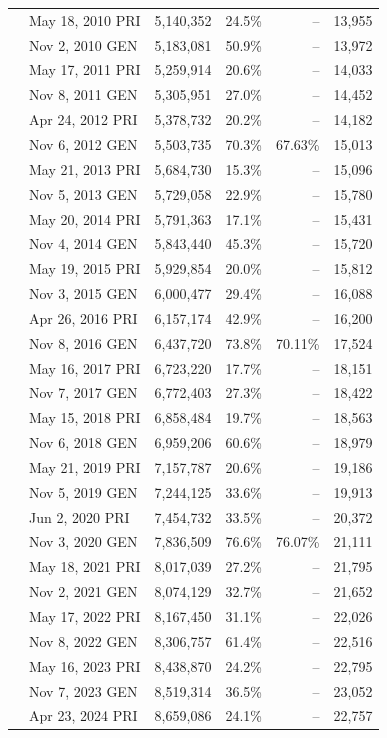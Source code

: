 \begin{longtable}{llrrrr}
 & May 18, 2010 PRI & 5,140,352 & 24.5\% & -- & 13,955 \\
 & Nov 2, 2010 GEN & 5,183,081 & 50.9\% & -- & 13,972 \\
 & May 17, 2011 PRI & 5,259,914 & 20.6\% & -- & 14,033 \\
 & Nov 8, 2011 GEN & 5,305,951 & 27.0\% & -- & 14,452 \\
 & Apr 24, 2012 PRI & 5,378,732 & 20.2\% & -- & 14,182 \\
 & Nov 6, 2012 GEN & 5,503,735 & 70.3\% & 67.63\% & 15,013 \\
 & May 21, 2013 PRI & 5,684,730 & 15.3\% & -- & 15,096 \\
 & Nov 5, 2013 GEN & 5,729,058 & 22.9\% & -- & 15,780 \\
 & May 20, 2014 PRI & 5,791,363 & 17.1\% & -- & 15,431 \\
 & Nov 4, 2014 GEN & 5,843,440 & 45.3\% & -- & 15,720 \\
 & May 19, 2015 PRI & 5,929,854 & 20.0\% & -- & 15,812 \\
 & Nov 3, 2015 GEN & 6,000,477 & 29.4\% & -- & 16,088 \\
 & Apr 26, 2016 PRI & 6,157,174 & 42.9\% & -- & 16,200 \\
 & Nov 8, 2016 GEN & 6,437,720 & 73.8\% & 70.11\% & 17,524 \\
 & May 16, 2017 PRI & 6,723,220 & 17.7\% & -- & 18,151 \\
 & Nov 7, 2017 GEN & 6,772,403 & 27.3\% & -- & 18,422 \\
 & May 15, 2018 PRI & 6,858,484 & 19.7\% & -- & 18,563 \\
 & Nov 6, 2018 GEN & 6,959,206 & 60.6\% & -- & 18,979 \\
 & May 21, 2019 PRI & 7,157,787 & 20.6\% & -- & 19,186 \\
 & Nov 5, 2019 GEN & 7,244,125 & 33.6\% & -- & 19,913 \\
 & Jun 2, 2020 PRI & 7,454,732 & 33.5\% & -- & 20,372 \\
 & Nov 3, 2020 GEN & 7,836,509 & 76.6\% & 76.07\% & 21,111 \\
 & May 18, 2021 PRI & 8,017,039 & 27.2\% & -- & 21,795 \\
 & Nov 2, 2021 GEN & 8,074,129 & 32.7\% & -- & 21,652 \\
 & May 17, 2022 PRI & 8,167,450 & 31.1\% & -- & 22,026 \\
 & Nov 8, 2022 GEN & 8,306,757 & 61.4\% & -- & 22,516 \\
 & May 16, 2023 PRI & 8,438,870 & 24.2\% & -- & 22,795 \\
 & Nov 7, 2023 GEN & 8,519,314 & 36.5\% & -- & 23,052 \\
 & Apr 23, 2024 PRI & 8,659,086 & 24.1\% & -- & 22,757 \\
\end{longtable}
